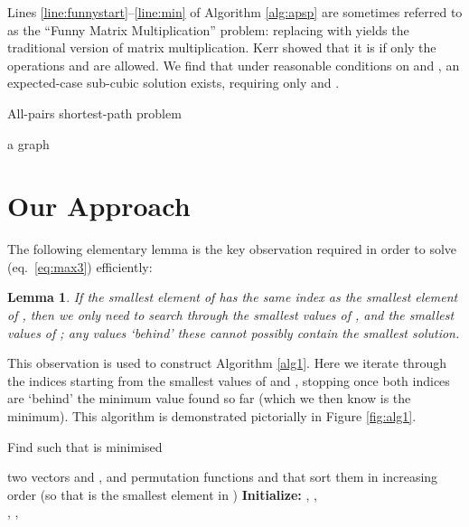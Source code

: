 \documentclass[a4paper,10pt]{article}
\newtheorem{lemma}[theorem]{Lemma}
\newcommand{\eq}[1]{(eq.~\ref{#1})}
\begin{document}
Lines \ref{line:funnystart}--\ref{line:min} of Algorithm \ref{alg:apsp} are sometimes referred to as the ``Funny Matrix Multiplication'' problem: replacing  with  yields the traditional version of matrix multiplication. Kerr \cite{Kerr70} showed that it is  if only the operations  and  are allowed. We find that under reasonable conditions on  and , an expected-case sub-cubic solution exists, requiring only  and .

\begin{algorithm}
 \caption{All-pairs shortest-path problem}
 \label{alg:apsp}
\begin{algorithmic}[1]
 \REQUIRE a graph 
 \FOR{}
   \FOR{}
     \STATE 
   \ENDFOR
 \ENDFOR
 \FOR{ \COMMENT{}}
   \FOR{} \label{line:funnystart}
     \FOR{}
       \STATE  \COMMENT{} \label{line:min}
     \ENDFOR
   \ENDFOR\ \COMMENT{}
 \ENDFOR\ \COMMENT{}
\end{algorithmic}
\end{algorithm}

\section{Our Approach}

The following elementary lemma is the key observation required in order to solve \eq{eq:max3} efficiently:

\begin{lemma}
If the  smallest element of  has the same index as the  smallest element of , then we only need to search through the  smallest values of , and the  smallest values of ; any values `behind' these cannot possibly contain the smallest solution.
\label{main_lemma}
\end{lemma}

This observation is used to construct Algorithm \ref{alg1}. Here we iterate through the indices starting from the smallest values of  and , stopping once both indices are `behind' the minimum value found so far (which we then know is the minimum). This algorithm is demonstrated pictorially in Figure \ref{fig:alg1}.

\begin{algorithm}
  \caption{Find  such that  is minimised}
  \label{alg1}
\begin{algorithmic}[1]
\REQUIRE two vectors  and , and permutation functions  and  that sort them in increasing order (so that  is the smallest element in )
\STATE \textbf{Initialize:} ,
, 
\\
\STATE , 
\IF {}
\STATE , 
\ENDIF
\WHILE{
}\label{line2}
\STATE 
\IF {} \label{if1}
\STATE 
\STATE 
\ENDIF
\IF {}
\STATE 
\ENDIF \label{endif1}
\STATE {} \label{line:repeat}
\ENDWHILE\ 
\RETURN 
\end{algorithmic}
\end{algorithm}
\end{document}
